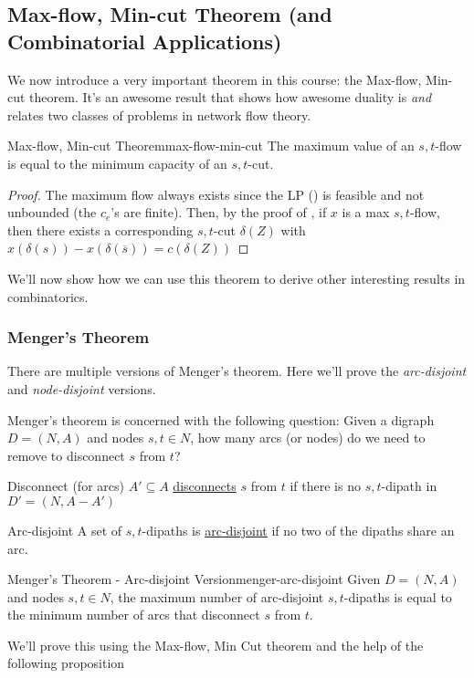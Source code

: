 \subsection{Max-flow, Min-cut Theorem (and Combinatorial Applications)}
We now introduce a very important theorem in this course: the Max-flow, Min-cut theorem.
It's an awesome result that shows how awesome duality is \textit{and} relates two classes of problems in network flow theory.

\begin{theorem}{Max-flow, Min-cut Theorem}{max-flow-min-cut}
    The maximum value of an $s,t$-flow is equal to the minimum capacity of an $s,t$-cut.
\end{theorem}
\begin{proof}
    The maximum flow always exists since the LP () is feasible and not unbounded (the $c_e$'s are finite). 
    Then, by the proof of , if $x$ is a max $s,t$-flow, then there exists a corresponding $s,t$-cut $\delta(Z)$ with $x(\delta(s)) - x(\delta(\overline{s})) = c(\delta(Z))$
\end{proof}

We'll now show how we can use this theorem to derive other interesting results in combinatorics.

\subsubsection{Menger's Theorem}
There are multiple versions of Menger's theorem. Here we'll prove the \textit{arc-disjoint} and \textit{node-disjoint} versions.

Menger's theorem is concerned with the following question: Given a digraph $D = (N, A)$ and nodes $s,t \in N$, how many arcs (or nodes) do we need to remove to disconnect $s$ from $t$?

\begin{definition}{Disconnect (for arcs)}{}
    $A' \subseteq A$ \underline{disconnects} $s$ from $t$ if there is no $s,t$-dipath in $D' = (N, A - A')$
\end{definition}

\begin{definition}{Arc-disjoint}{}
    A set of $s,t$-dipaths is \underline{arc-disjoint} if no two of the dipaths share an arc.
\end{definition}

\begin{theorem}{Menger's Theorem - Arc-disjoint Version}{menger-arc-disjoint}
    Given $D = (N,A)$ and nodes $s,t \in N$, the maximum number of arc-disjoint $s,t$-dipaths is equal to the minimum number of arcs that disconnect $s$ from $t$.
\end{theorem}
We'll prove this using the Max-flow, Min Cut theorem and the help of the following proposition

